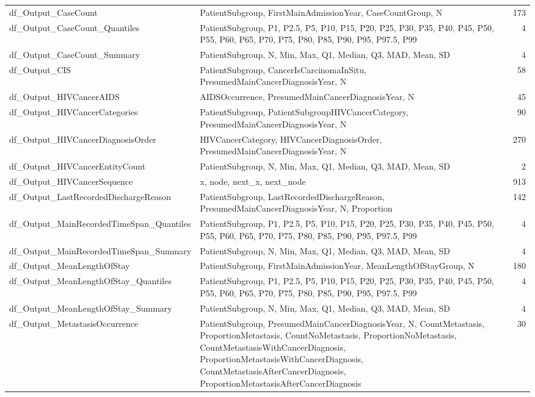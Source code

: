 \documentclass[
  letterpaper,
  DIV=11,
  numbers=noendperiod]{scrreprt}
\begin{document}
\begin{longtable*}{llr}
df\_Output\_CaseCount & PatientSubgroup, FirstMainAdmissionYear, CaseCountGroup, N & 173 \\ 
df\_Output\_CaseCount\_Quantiles & PatientSubgroup, P1, P2.5, P5, P10, P15, P20, P25, P30, P35, P40, P45, P50, P55, P60, P65, P70, P75, P80, P85, P90, P95, P97.5, P99 & 4 \\ 
df\_Output\_CaseCount\_Summary & PatientSubgroup, N, Min, Max, Q1, Median, Q3, MAD, Mean, SD & 4 \\ 
df\_Output\_CIS & PatientSubgroup, CancerIsCarcinomaInSitu, PresumedMainCancerDiagnosisYear, N & 58 \\ 
df\_Output\_HIVCancerAIDS & AIDSOccurrence, PresumedMainCancerDiagnosisYear, N & 45 \\ 
df\_Output\_HIVCancerCategories & PatientSubgroup, PatientSubgroupHIVCancerCategory, PresumedMainCancerDiagnosisYear, N & 90 \\ 
df\_Output\_HIVCancerDiagnosisOrder & HIVCancerCategory, HIVCancerDiagnosisOrder, PresumedMainCancerDiagnosisYear, N & 270 \\ 
df\_Output\_HIVCancerEntityCount & PatientSubgroup, N, Min, Max, Q1, Median, Q3, MAD, Mean, SD & 2 \\ 
df\_Output\_HIVCancerSequence & x, node, next\_x, next\_node & 913 \\ 
df\_Output\_LastRecordedDischargeReason & PatientSubgroup, LastRecordedDischargeReason, PresumedMainCancerDiagnosisYear, N, Proportion & 142 \\ 
df\_Output\_MainRecordedTimeSpan\_Quantiles & PatientSubgroup, P1, P2.5, P5, P10, P15, P20, P25, P30, P35, P40, P45, P50, P55, P60, P65, P70, P75, P80, P85, P90, P95, P97.5, P99 & 4 \\ 
df\_Output\_MainRecordedTimeSpan\_Summary & PatientSubgroup, N, Min, Max, Q1, Median, Q3, MAD, Mean, SD & 4 \\ 
df\_Output\_MeanLengthOfStay & PatientSubgroup, FirstMainAdmissionYear, MeanLengthOfStayGroup, N & 180 \\ 
df\_Output\_MeanLengthOfStay\_Quantiles & PatientSubgroup, P1, P2.5, P5, P10, P15, P20, P25, P30, P35, P40, P45, P50, P55, P60, P65, P70, P75, P80, P85, P90, P95, P97.5, P99 & 4 \\ 
df\_Output\_MeanLengthOfStay\_Summary & PatientSubgroup, N, Min, Max, Q1, Median, Q3, MAD, Mean, SD & 4 \\ 
df\_Output\_MetastasisOccurrence & PatientSubgroup, PresumedMainCancerDiagnosisYear, N, CountMetastasis, ProportionMetastasis, CountNoMetastasis, ProportionNoMetastasis, CountMetastasisWithCancerDiagnosis, ProportionMetastasisWithCancerDiagnosis, CountMetastasisAfterCancerDiagnosis, ProportionMetastasisAfterCancerDiagnosis & 30 \\ 

\end{longtable*}
\end{document}
